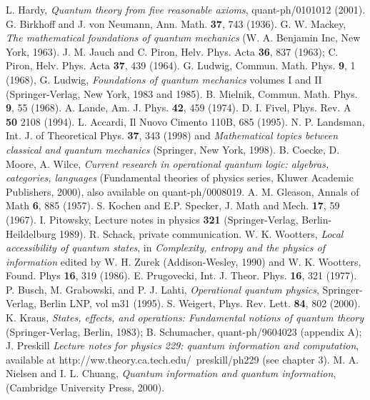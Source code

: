 \documentclass[10pt]{article}
\begin{document}
\begin{thebibliography}{00}
 L. Hardy, {\it Quantum theory from five reasonable
axioms}, quant-ph/0101012 (2001).
 G. Birkhoff and J. von Neumann, Ann. Math. {\bf 37},
743 (1936).
 G. W. Mackey, {\it The mathematical foundations of
quantum mechanics} (W. A. Benjamin Inc, New York, 1963).
 J. M. Jauch and C. Piron, Helv. Phys. Acta {\bf 36},
837 (1963); C. Piron, Helv. Phys. Acta {\bf 37}, 439 (1964).
 G. Ludwig, Commun. Math. Phys. {\bf 9}, 1 (1968), G.
Ludwig, {\it Foundations of quantum mechanics} volumes I and II
(Springer-Verlag, New York, 1983 and 1985).
 B. Mielnik, Commun. Math. Phys. {\bf 9}, 55 (1968).
 A. Lande, Am. J. Phys. {\bf 42}, 459 (1974).
 D. I. Fivel, Phys. Rev. A {\bf 50} 2108 (1994).
 L. Accardi, Il Nuovo Cimento 110B, 685 (1995).
 N. P. Landsman, Int. J. of Theoretical Phys. {\bf
37}, 343 (1998) and {\it Mathematical topics between classical and
quantum mechanics} (Springer, New York, 1998).
 B. Coecke, D. Moore, A. Wilce, {\it Current research in
operational quantum logic: algebras, categories, languages} (Fundamental
theories of physics series, Kluwer Academic Publishers, 2000), also
available on quant-ph/0008019.
 A. M. Gleason, Annals of Math {\bf 6}, 885 (1957).
 S. Kochen and E.P. Specker, J. Math and Mech. {\bf 17},
59 (1967).
 I. Pitowsky, Lecture notes in physics {\bf 321}
(Springer-Verlag, Berlin-Heildelburg 1989).
 R. Schack, private communication.
 W. K. Wootters, {\it Local accessibility of quantum
states}, in {\it Complexity, entropy and the physics of information}
edited by W. H. Zurek (Addison-Wesley, 1990) and W. K. Wootters, Found.
Phys {\bf 16}, 319 (1986).
 E. Prugovecki, Int. J. Theor. Phys. {\bf 16}, 321 (1977).
 P. Busch, M. Grabowski, and P. J. Lahti, {\it
Operational quantum physics}, Springer-Verlag, Berlin LNP, vol m31 (1995).
 S. Weigert, Phys. Rev. Lett. {\bf 84}, 802 (2000).
 K. Kraus, {\it States, effects, and operations:
Fundamental notions of quantum theory} (Springer-Verlag, Berlin, 1983);
B. Schumacher, quant-ph/9604023 (appendix A); J. Preskill {\it Lecture
notes for physics 229: quantum information and computation}, available
at http://ww.theory.ca.tech.edu/~preskill/ph229 (see chapter 3).
 M. A. Nielsen and I. L. Chuang, {\it Quantum
information and quantum information}, (Cambridge University Press,
2000).
\end{thebibliography}
\end{document}

